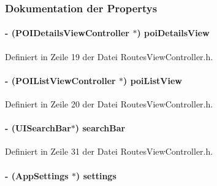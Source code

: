 \subsubsection{Dokumentation der Propertys}
\hypertarget{interface_routes_view_controller_a9a4b642d1d81169b4286b0cdf6fd88ac}{
\paragraph[{poiDetailsView}]{\setlength{\rightskip}{0pt plus 5cm}-\/ ({\bf POIDetailsViewController} $\ast$) poiDetailsView}\hfill}
\label{interface_routes_view_controller_a9a4b642d1d81169b4286b0cdf6fd88ac}


Definiert in Zeile 19 der Datei RoutesViewController.h.\hypertarget{interface_routes_view_controller_aaa85ec4bf6eacc92d4d5bcbf70e74f14}{
\paragraph[{poiListView}]{\setlength{\rightskip}{0pt plus 5cm}-\/ ({\bf POIListViewController} $\ast$) poiListView}\hfill}
\label{interface_routes_view_controller_aaa85ec4bf6eacc92d4d5bcbf70e74f14}


Definiert in Zeile 20 der Datei RoutesViewController.h.\hypertarget{interface_routes_view_controller_a04efbef6eaed2968767455ff481ee713}{
\paragraph[{searchBar}]{\setlength{\rightskip}{0pt plus 5cm}-\/ (UISearchBar$\ast$) {\bf searchBar}}\hfill}
\label{interface_routes_view_controller_a04efbef6eaed2968767455ff481ee713}


Definiert in Zeile 31 der Datei RoutesViewController.h.\hypertarget{interface_routes_view_controller_a573fe62b035ab38208564db3f8d7ba1a}{
\paragraph[{settings}]{\setlength{\rightskip}{0pt plus 5cm}-\/ ({\bf AppSettings} $\ast$) settings}\hfill}
\label{interface_routes_view_controller_a573fe62b035ab38208564db3f8d7ba1a}


